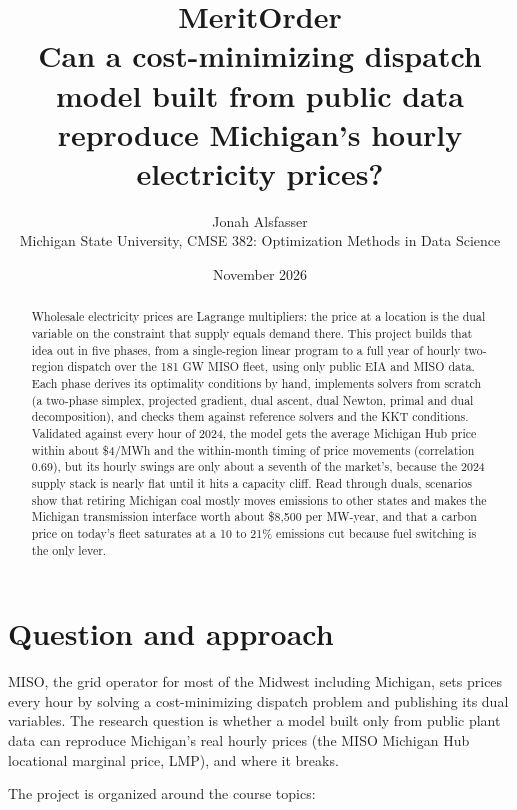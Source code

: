 \documentclass[11pt]{article}
\title{\textbf{MeritOrder}\\[0.3em]\large Can a cost-minimizing dispatch model built from public data\\reproduce Michigan's hourly electricity prices?}
\author{Jonah Alsfasser\\Michigan State University, CMSE 382: Optimization Methods in Data Science}
\date{November 2026}
\begin{document}
\maketitle

\begin{abstract}
\noindent
Wholesale electricity prices are Lagrange multipliers: the price at a location is the dual variable on the constraint that supply equals demand there. This project builds that idea out in five phases, from a single-region linear program to a full year of hourly two-region dispatch over the 181 GW MISO fleet, using only public EIA and MISO data. Each phase derives its optimality conditions by hand, implements solvers from scratch (a two-phase simplex, projected gradient, dual ascent, dual Newton, primal and dual decomposition), and checks them against reference solvers and the KKT conditions. Validated against every hour of 2024, the model gets the average Michigan Hub price within about \$4/MWh and the within-month timing of price movements (correlation 0.69), but its hourly swings are only about a seventh of the market's, because the 2024 supply stack is nearly flat until it hits a capacity cliff. Read through duals, scenarios show that retiring Michigan coal mostly moves emissions to other states and makes the Michigan transmission interface worth about \$8{,}500 per MW-year, and that a carbon price on today's fleet saturates at a 10 to 21\% emissions cut because fuel switching is the only lever.
\end{abstract}

\tableofcontents
\newpage

\section{Question and approach}

MISO, the grid operator for most of the Midwest including Michigan, sets prices every hour by solving a cost-minimizing dispatch problem and publishing its dual variables. The research question is whether a model built only from public plant data can reproduce Michigan's real hourly prices (the MISO Michigan Hub locational marginal price, LMP), and where it breaks.

The project is organized around the course topics:
\end{document}
